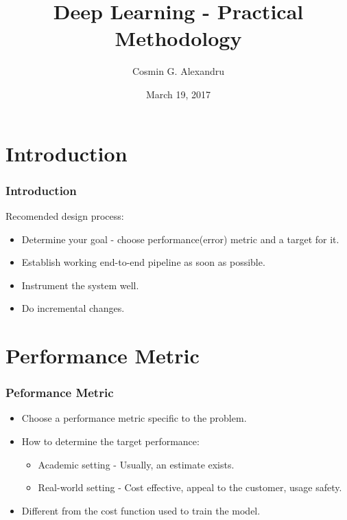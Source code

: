 \documentclass{beamer}
\title{Deep Learning - Practical Methodology}
\author{Cosmin G. Alexandru}
\institute{BucharestCV}
\date{March 19, 2017}
\begin{document}
\begin{frame}
\titlepage
\end{frame}



\section{Introduction}\label{sec:introduction}
\begin{frame}
    \frametitle{Introduction}
    Recomended design process:
    \begin{itemize}
        \item Determine your goal - choose performance(error) metric and a target
            for it.
        \item Establish working end-to-end pipeline as soon as possible.
        \item Instrument the system well.
        \item Do incremental changes.
    \end{itemize}
\end{frame}

\section{Performance Metric}\label{sec:perf-metrics}
\begin{frame}
    \frametitle{Peformance Metric}
    \begin{itemize}
        \item Choose a performance metric specific to the problem.
        \item How to determine the target performance:
            \begin{itemize}
                \item Academic setting - Usually, an estimate exists.
                \item Real-world setting - Cost effective, appeal to the customer,
                    usage safety.
            \end{itemize}
        \item Different from the cost function used to train the model.
    \end{itemize}
\end{frame}
\end{document}
